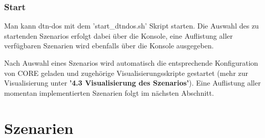 \documentclass{article}
\begin{document}
\subsubsection{Start}
Man kann dtn-dos mit dem 'start\_dtndos.sh' Skript starten. Die Auswahl des zu startenden Szenarios erfolgt dabei über die Konsole, eine Auflistung aller verfügbaren Szenarien wird ebenfalls über die Konsole ausgegeben.\par
Nach Auswahl eines Szenarios wird automatisch die entsprechende Konfiguration von CORE geladen und zugehörige Visualisierungsskripte gestartet (mehr zur Visualisierung unter \textbf{'4.3 Visualisierung des Szenarios'}). Eine Auflistung aller momentan implementierten Szenarien folgt im nächsten Abschnitt.
\section{Szenarien}
\end{document}
